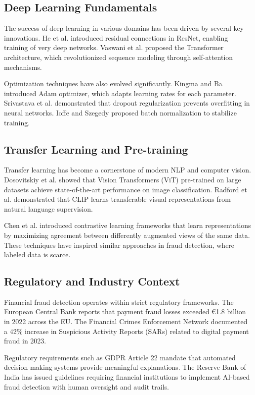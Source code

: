 \subsection{Deep Learning Fundamentals}

The success of deep learning in various domains has been driven by several key innovations. He et al. \cite{he2016deep} introduced residual connections in ResNet, enabling training of very deep networks. Vaswani et al. \cite{vaswani2017attention} proposed the Transformer architecture, which revolutionized sequence modeling through self-attention mechanisms.

Optimization techniques have also evolved significantly. Kingma and Ba \cite{kingma2014adam} introduced Adam optimizer, which adapts learning rates for each parameter. Srivastava et al. \cite{srivastava2014dropout} demonstrated that dropout regularization prevents overfitting in neural networks. Ioffe and Szegedy \cite{ioffe2015batch} proposed batch normalization to stabilize training.

\subsection{Transfer Learning and Pre-training}

Transfer learning has become a cornerstone of modern NLP and computer vision. Dosovitskiy et al. \cite{dosovitskiy2020image} showed that Vision Transformers (ViT) pre-trained on large datasets achieve state-of-the-art performance on image classification. Radford et al. \cite{radford2021learning} demonstrated that CLIP learns transferable visual representations from natural language supervision.

Chen et al. \cite{chen2020simple} introduced contrastive learning frameworks that learn representations by maximizing agreement between differently augmented views of the same data. These techniques have inspired similar approaches in fraud detection, where labeled data is scarce.

\subsection{Regulatory and Industry Context}

Financial fraud detection operates within strict regulatory frameworks. The European Central Bank \cite{ecb2022payment} reports that payment fraud losses exceeded €1.8 billion in 2022 across the EU. The Financial Crimes Enforcement Network \cite{fincen2023sar} documented a 42\% increase in Suspicious Activity Reports (SARs) related to digital payment fraud in 2023.

Regulatory requirements such as GDPR Article 22 mandate that automated decision-making systems provide meaningful explanations. The Reserve Bank of India \cite{rbi2023} has issued guidelines requiring financial institutions to implement AI-based fraud detection with human oversight and audit trails.
